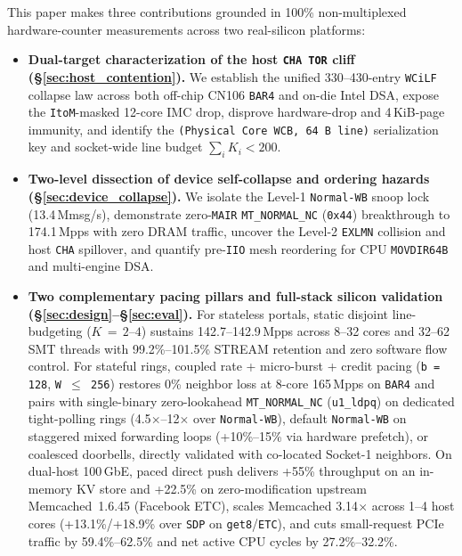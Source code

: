 This paper makes three contributions grounded in 100\% non-multiplexed hardware-counter measurements across two real-silicon platforms:
\begin{itemize}
  \item \textbf{Dual-target characterization of the host \texttt{CHA TOR} cliff (\S\ref{sec:host_contention}).} We establish the unified 330--430-entry \texttt{WCiLF} collapse law across both off-chip CN106 \texttt{BAR4} and on-die Intel DSA, expose the \texttt{ItoM}-masked 12-core IMC drop, disprove hardware-drop and 4\,KiB-page immunity, and identify the \texttt{(Physical Core WCB, 64\,B line)} serialization key and socket-wide line budget $\sum_i K_i < 200$.
  \item \textbf{Two-level dissection of device self-collapse and ordering hazards (\S\ref{sec:device_collapse}).} We isolate the Level-1 \texttt{Normal-WB} snoop lock (13.4\,Mmsg/s), demonstrate zero-\texttt{MAIR} \texttt{MT\_NORMAL\_NC} (\texttt{0x44}) breakthrough to 174.1\,Mpps with zero DRAM traffic, uncover the Level-2 \texttt{EXLMN} collision and host \texttt{CHA} spillover, and quantify pre-\texttt{IIO} mesh reordering for CPU \texttt{MOVDIR64B} and multi-engine DSA.
  \item \textbf{Two complementary pacing pillars and full-stack silicon validation (\S\ref{sec:design}--\S\ref{sec:eval}).} For stateless portals, static disjoint line-budgeting ($K\,=\,2$--$4$) sustains 142.7--142.9\,Mpps across 8--32 cores and 32--62 SMT threads with 99.2\%--101.5\% STREAM retention and zero software flow control. For stateful rings, coupled rate + micro-burst + credit pacing (\texttt{b\,=\,128}, \texttt{W\,$\le$\,256}) restores 0\% neighbor loss at 8-core 165\,Mpps on \texttt{BAR4} and pairs with single-binary zero-lookahead \texttt{MT\_NORMAL\_NC} (\texttt{u1\_ldpq}) on dedicated tight-polling rings (4.5$\times$--12$\times$ over \texttt{Normal-WB}), default \texttt{Normal-WB} on staggered mixed forwarding loops (+10\%--15\% via hardware prefetch), or coalesced doorbells, directly validated with co-located Socket-1 neighbors. On dual-host 100\,GbE, paced direct push delivers +55\% throughput on an in-memory KV store and +22.5\% on zero-modification upstream Memcached~1.6.45 (Facebook ETC), scales Memcached 3.14$\times$ across 1--4 host cores (+13.1\%/+18.9\% over \texttt{SDP} on \texttt{get8}/\texttt{ETC}), and cuts small-request PCIe traffic by 59.4\%--62.5\% and net active CPU cycles by 27.2\%--32.2\%.
\end{itemize}
